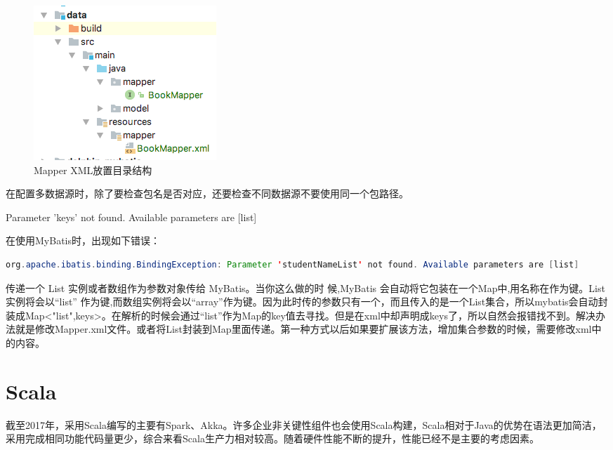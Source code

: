 \documentclass[12pt]{book}
\makeatletter
\numberwithin{dummy}{section}
\theoremstyle{ocrenumbox}
\theoremstyle{blacknumex}
\theoremstyle{blacknumbox}
\theoremstyle{ocrenum}
\renewcommand\paragraph{\@startsection{paragraph}{4}{\z@}
	{-2ex \@plus-.2ex \@minus .2ex}
	{.1ex}
	{\normalfont\small\sffamily\bfseries}}
\makeatother
\begin{document}
\begin{figure}[htbp]
	\centering
	\includegraphics[scale=0.7]{mapperreourcestructure.png}
	\caption{Mapper XML放置目录结构}
	\label{fig:mapperreourcestructure}
\end{figure}

在配置多数据源时，除了要检查包名是否对应，还要检查不同数据源不要使用同一个包路径。

\paragraph{Parameter 'keys' not found. Available parameters are [list]}

在使用MyBatis时，出现如下错误：

\begin{lstlisting}[language=Java]
org.apache.ibatis.binding.BindingException: Parameter 'studentNameList' not found. Available parameters are [list]
\end{lstlisting}

传递一个 List 实例或者数组作为参数对象传给 MyBatis。当你这么做的时 候,MyBatis 会自动将它包装在一个Map中,用名称在作为键。List 实例将会以“list” 作为键,而数组实例将会以“array”作为键。因为此时传的参数只有一个，而且传入的是一个List集合，所以mybatis会自动封装成Map<"list",keys>。在解析的时候会通过“list”作为Map的key值去寻找。但是在xml中却声明成keys了，所以自然会报错找不到。解决办法就是修改Mapper.xml文件。或者将List封装到Map里面传递。第一种方式以后如果要扩展该方法，增加集合参数的时候，需要修改xml中的内容。

\newpage

\chapter{Scala}

截至2017年，采用Scala编写的主要有Spark、Akka。许多企业非关键性组件也会使用Scala构建，Scala相对于Java的优势在语法更加简洁，采用完成相同功能代码量更少，综合来看Scala生产力相对较高。随着硬件性能不断的提升，性能已经不是主要的考虑因素。
\end{document}
